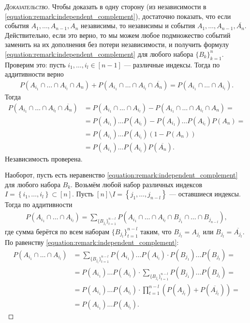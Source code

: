 \documentclass[../main.tex]{subfiles}
\begin{document}
\begin{proof}[\normalfont\textsc{Доказательство}]
 Чтобы доказать в одну сторону (из независимости в \eqref{equation:remark:independent_complement}), достаточно показать, что если события $A_1, \ldots, A_{n-1}, A_n$ независимы, то независимы и события $A_1, \ldots, A_{n-1}, \overline{A_n}$. Действительно, если это верно, то мы можем любое подмножество событий заменить на их дополнения без потери независимости, и получить формулу \eqref{equation:remark:independent_complement} для любого набора $\{B_{k}\}_{k=1}^{n} $. Проверим это: пусть $i_1, \ldots, i_{l} \in [n-1]$ --- различные индексы. Тогда по аддитивности верно
 \begin{align*}
  P(A_{i_1} \cap \ldots \cap A_{i_l} \cap A_n) + P(A_{i_1} \cap \ldots \cap A_{i_l} \cap \overline{A_n}) = P(A_{i_1} \cap \ldots \cap A_{i_l}).
 \end{align*} Тогда
 \begin{align*}
  P(A_{i_1} \cap \ldots \cap A_{i_l}\cap \overline{A_n}) &= P(A_{i_1} \cap \ldots \cap A_{i_l}) - P(A_{i_1} \cap \ldots \cap A_{i_l} \cap A_n) = \\
  &= P(A_{i_1})  \ldots  P(A_{i_l}) - P(A_{i_1})  \ldots  P(A_{i_l})  P(A_n) = \\
  &= P(A_{i_1})  \ldots  P(A_{i_l})  (1 - P(A_n)) \\
  &= P(A_{i_1})  \ldots  P(A_{i_l})  P(\overline{A_n}).
 \end{align*} Независимость проверена.

 Наоборот, пусть есть неравенство \eqref{equation:remark:independent_complement} для любого набора $B_k$. Возьмём любой набор различных индексов $I = \left\{i_1, \ldots, i_l \right\} \subset [n]$. Пусть $[n] \setminus I = \left\{ j_1, \ldots, j_{n-l} \right\}$ --- оставшиеся индексы. Тогда по аддитивности
 \begin{align*}
  P(A_{i_1} \cap \ldots \cap A_{i_l}) = \sum_{\{B_{j_t}\}_{t=1}^{n-l} } P(A_{i_1} \cap \ldots \cap A_{i_l} \cap B_{j_1} \cap \ldots \cap B_{j_{n-l}}),
 \end{align*} где сумма берётся по всем наборам $ \{B_{j_t}\}_{t=1}^{n-l} $ таким, что $B_{j_t} = A_{j_t}$ или $B_{j_t} = \overline{A_{j_t}}$. По равенству \eqref{equation:remark:independent_complement}:
 \begin{align*}
  P(A_{i_1} \cap \ldots \cap A_{i_l}) &= \sum_{\{B_{j_t}\}_{t=1}^{n-l} } P(A_{i_1}) \ldots P(A_{i_l}) \cdot P(B_{j_1}) \ldots P(B_{j_t}) = \\
  &= P(A_{i_1}) \ldots P(A_{i_l}) \cdot \sum_{\{B_{j_t}\}_{t=1}^{n-l} } P(B_{j_1}) \ldots P(B_{j_t}) = \\
  &= P(A_{i_1}) \ldots P(A_{i_l}) \cdot \prod_{t=1}^{n-l} (P(A_{j_t}) + P(\overline{A_{j_t}})) = \\
  &= P(A_{i_1}) \ldots P(A_{i_l}).
 \end{align*} 
\end{proof}
\end{document}
